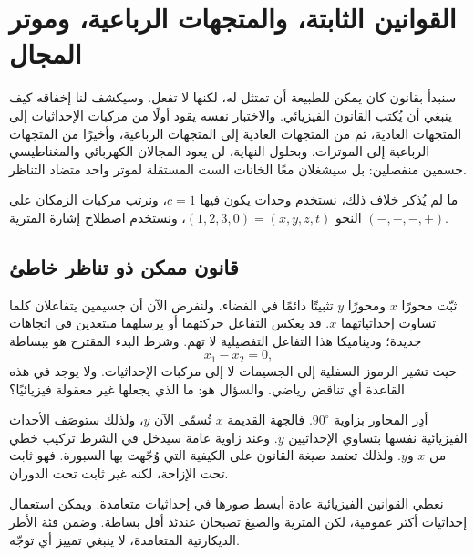 \chapter{القوانين الثابتة، والمتجهات الرباعية، وموتر المجال}

سنبدأ بقانون كان يمكن للطبيعة أن تمتثل له، لكنها لا تفعل. وسيكشف لنا إخفاقه كيف ينبغي أن يُكتب القانون الفيزيائي. والاختبار نفسه يقود أولًا من مركبات الإحداثيات إلى المتجهات العادية، ثم من المتجهات العادية إلى المتجهات الرباعية، وأخيرًا من المتجهات الرباعية إلى الموترات. وبحلول النهاية، لن يعود المجالان الكهربائي والمغناطيسي جسمين منفصلين: بل سيشغلان معًا الخانات الست المستقلة لموتر واحد متضاد التناظر.

ما لم يُذكر خلاف ذلك، نستخدم وحدات يكون فيها \(c=1\)، ونرتب مركبات الزمكان على النحو \((1,2,3,0)=(x,y,z,t)\)، ونستخدم اصطلاح إشارة المترية \((-,-,-,+)\).

\section{قانون ممكن ذو تناظر خاطئ}

ثبّت محورًا \(x\) ومحورًا \(y\) تثبيتًا دائمًا في الفضاء. ولنفرض الآن أن جسيمين يتفاعلان كلما تساوت إحداثياتهما \(x\). قد يعكس التفاعل حركتهما أو يرسلهما مبتعدين في اتجاهات جديدة؛ وديناميكا هذا التفاعل التفصيلية لا تهم. وشرط البدء المقترح هو ببساطة \begin{equation}
  x_1-x_2=0,
\end{equation} حيث تشير الرموز السفلية إلى الجسيمات لا إلى مركبات الإحداثيات. ولا يوجد في هذه القاعدة أي تناقض رياضي. والسؤال هو: ما الذي يجعلها غير معقولة فيزيائيًا؟

\begin{classroomqa}   \end{classroomqa}

أدِر المحاور بزاوية \(90^\circ\). فالجهة القديمة \(x\) تُسمّى الآن \(y\)، ولذلك ستوصَف الأحداث الفيزيائية نفسها بتساوي الإحداثيين \(y\). وعند زاوية عامة سيدخل في الشرط تركيب خطي من \(x\) و\(y\). ولذلك تعتمد صيغة القانون على الكيفية التي وُجّهت بها السبورة. فهو ثابت تحت الإزاحة، لكنه غير ثابت تحت الدوران.

نعطي القوانين الفيزيائية عادة أبسط صورها في إحداثيات متعامدة. ويمكن استعمال إحداثيات أكثر عمومية، لكن المترية والصيغ تصبحان عندئذ أقل بساطة. وضمن فئة الأطر الديكارتية المتعامدة، لا ينبغي تمييز أي توجّه.

